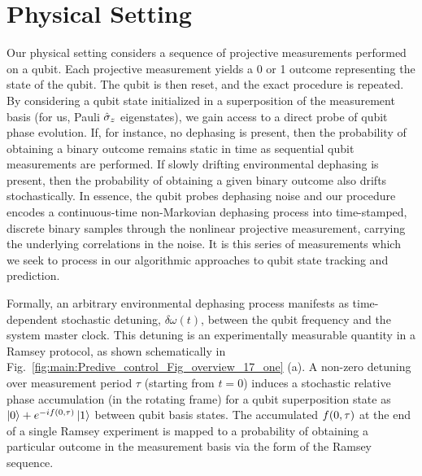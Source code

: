 \section{Physical Setting \label{sec:main:PhysicalSetting}}  
\label{sec:main:1} 

Our physical setting considers a sequence of projective measurements performed on a qubit. Each projective measurement yields a 0 or 1 outcome representing the state of the qubit. The qubit is then reset, and the exact procedure is repeated. By considering a qubit state initialized in a superposition of the measurement basis (for us, Pauli $\hat{\sigma}_{z}$ eigenstates), we gain access to a direct probe of qubit phase evolution.  If, for instance, no dephasing is present, then the probability of obtaining a binary outcome remains static in time as sequential qubit measurements are performed. If slowly drifting environmental dephasing is present, then the probability of obtaining a given binary outcome also drifts stochastically. In essence, the qubit probes dephasing noise and our procedure encodes a continuous-time non-Markovian dephasing process into time-stamped, discrete binary samples through the nonlinear projective measurement, carrying the underlying correlations in the noise.  It is this series of measurements which we seek to process in our algorithmic approaches to qubit state tracking and prediction. 

Formally, an arbitrary environmental dephasing process manifests as time-dependent stochastic detuning, $\delta \omega (t)$, between the qubit frequency and the system master clock. This detuning is an experimentally measurable quantity in a Ramsey protocol, as shown schematically in Fig.~\ref{fig:main:Predive_control_Fig_overview_17_one} (a). A non-zero detuning over measurement period $\tau$ (starting from $t=0$) induces a stochastic relative phase accumulation (in the rotating frame) for a qubit superposition state as $\left|0\right\rangle+e^{-if(0, \tau)}\left|1\right\rangle$ between qubit basis states.  The accumulated $f(0, \tau)$ at the end of a single Ramsey experiment is mapped to a probability of obtaining a particular outcome in the measurement basis via the form of the Ramsey sequence.  

